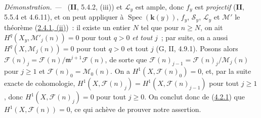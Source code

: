 \documentclass[10pt,oneside]{book}
\newenvironment{proof}{%
  \par\medskip\noindent\textit{Démonstration. ---\ }}{\par}
\begin{document}
\begin{proof}
(\textbf{II}, 5.4.2, (iii)) et $\mathcal L_y$ est ample, donc $f_y$ est \emph{projectif}
(\textbf{II}, 5.5.4 et 4.6.11), et on peut appliquer à
$\operatorname{Spec}(\boldsymbol{k}(y))$, $f_y$, $\mathcal S_y$, $\mathcal L_y$ et
$\mathcal M'$ le théorème (\hyperref[III.2.4.1-fr]{2.4.1, (ii)})~: il
existe un entier $N$ tel que pour $n\geq N$, on ait
$H^q(X_y,\mathcal M'_j(n))=0$ pour tout $q>0$ \emph{et tout} $j$~; par suite, on a
aussi $H^q(X,\mathcal M_j(n))=0$ pour tout $q>0$ et tout $j$
(G, II, 4.9.1). Posons alors
$\mathcal F(n)_j=\mathcal F(n)/\mathfrak m^{j+1}\mathcal F(n)$,
de sorte que $\mathcal F(n)_{j-1}=\mathcal F(n)_j/\mathcal M_j(n)$ pour
$j\geq1$ et $\mathcal F(n)_0=\mathcal M_0(n)$. On a
$H^1(X,\mathcal F(n)_0)=0$, et, par la suite exacte de cohomologie,
$H^1(X,\mathcal F(n)_j)=H^1(X,\mathcal F(n)_{j-1})$ pour tout $j\geq1$,
donc $H^1(X,\mathcal F(n)_j)=0$ pour tout $j\geq0$. On conclut donc de
(\hyperref[III.4.2.1-fr]{4.2.1}) que $H^1(X,\mathcal F(n))=0$, ce qui
achève de prouver notre assertion.


\end{proof}
\end{document}
